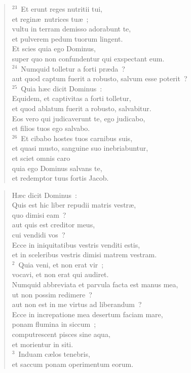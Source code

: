 \begin{flushleft}
\begin{verse}
${}^{23}$~Et erunt reges nutritii tui,\\ et regin\ae\ nutrices tu\ae~;\\ vultu in terram demisso adorabunt te,\\ et pulverem pedum tuorum lingent.\\ Et scies quia ego Dominus,\\ super quo non confundentur qui exspectant eum.\\
${}^{24}$~Numquid tolletur a forti pr\ae da~?\\ aut quod captum fuerit a robusto, salvum esse poterit~?\\
${}^{25}$~Quia h\ae c dicit Dominus~:\\ Equidem, et captivitas a forti tolletur,\\ et quod ablatum fuerit a robusto, salvabitur.\\ Eos vero qui judicaverunt te, ego judicabo,\\ et filios tuos ego salvabo.\\
${}^{26}$~Et cibabo hostes tuos carnibus suis,\\ et quasi musto, sanguine suo inebriabuntur,\\ et sciet omnis caro\\ quia ego Dominus salvans te,\\ et redemptor tuus fortis Jacob.\end{verse}\end{flushleft}


\begin{flushleft}\begin{verse}\vspace{-19pt}\hspace{6pt}H\ae c dicit Dominus~:\\\hspace{6pt} Quis est hic liber repudii matris vestr\ae ,\\ quo dimisi eam~?\\ aut quis est creditor meus,\\ cui vendidi vos~?\\ Ecce in iniquitatibus vestris venditi estis,\\ et in sceleribus vestris dimisi matrem vestram.\\
${}^{2}$~Quia veni, et non erat vir~;\\ vocavi, et non erat qui audiret.\\ Numquid abbreviata et parvula facta est manus mea,\\ ut non possim redimere~?\\ aut non est in me virtus ad liberandum~?\\ Ecce in increpatione mea desertum faciam mare,\\ ponam flumina in siccum~;\\ computrescent pisces sine aqua,\\ et morientur in siti.\\
${}^{3}$~Induam c\ae los tenebris,\\ et saccum ponam operimentum eorum.\end{verse}\end{flushleft}


